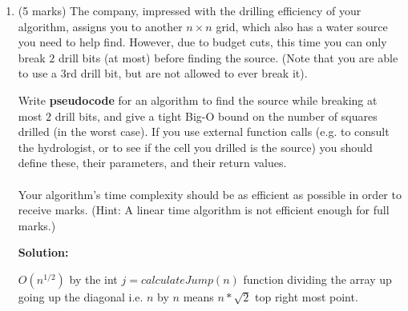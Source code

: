 \documentclass[a4,13pt]{extarticle}
\newenvironment{Solution}{\color{blue}\textbf{Solution:}}{}
\begin{document}
\begin{enumerate}
\begin{enumerate}
\begin{Solution}
	      	Approach:
	      	Two dimensional binary search moving in the diagonal direction.
	      	
	      	At most $\log(n^2)=2\log(n) \in O(log(n))$
	      	
	        If in one of the x,y direction we land on the arrows we will no longer move in that direction as we know we are on the right row or column.
	        
	        Clarification: in the code below for part a) and b) the axis is considered to be $(0,0)$ is the top-left most. The point $(1,0)$ is the point to the right of $(0,0)$ in the top column, i.e. moving in right direction for a increase in x.
	        Also, the array is inverted to axis, i.e. $arr[y_value][x_value]$
	      	
	      	\newpage
	      	    
	      	\end{Solution}
	      	
	        \newpage
	      	      	      	              
	      	\item 
	      	      (5 marks) The company, impressed with the drilling efficiency of your algorithm, assigns you to another $n \times n$ grid, 
	      	      which also has a water source you need to help find. However, due to budget cuts, this time you can only break $2$ drill 
	      	      bits (at most) before finding the source. (Note that you are able to use a $3$rd drill bit, but are not allowed to ever break it).
	      	      	      	              
	      	      Write \textbf{pseudocode} for an algorithm to find the source while breaking at most $2$ drill bits, and give a tight Big-O 
	      	      bound on the number of squares drilled (in the worst case). If you use external function calls (e.g. to consult the hydrologist, 
	      	      or to see if the cell you drilled is the source) you should define these, their parameters, and their return values. \\\\
	      	      Your algorithm's time complexity should be as efficient as possible in order to receive marks. 
	      	      (Hint: A linear time algorithm is not efficient enough for full marks.)

	      	\begin{Solution}
	      	
	      	$O(n^{1/2})$ by the int $j = calculateJump(n)$ function dividing the array up going up the diagonal i.e. $n$ by $n$ means $n*\sqrt{2}$ top right most point.
	      	

\end{Solution}
\end{enumerate}
\end{enumerate}
\end{document}
